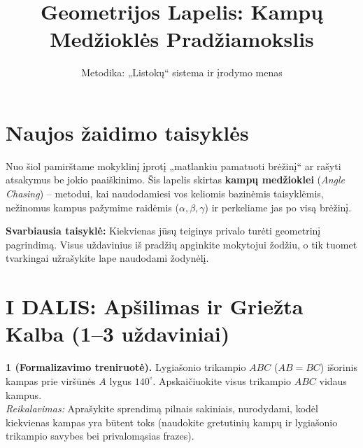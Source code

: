 \documentclass[11pt,a4paper]{scrartcl}
\title{\Large Geometrijos Lapelis: Kampų Medžioklės Pradžiamokslis}
\author{Metodika: „Listokų“ sistema ir įrodymo menas}
\date{}
\begin{document}
\maketitle

\section*{Naujos žaidimo taisyklės}

Nuo šiol pamirštame mokyklinį įprotį „matlankiu pamatuoti brėžinį“ ar rašyti atsakymus be jokio paaiškinimo. Šis lapelis skirtas \textbf{kampų medžioklei} (\textit{Angle Chasing}) – metodui, kai naudodamiesi vos keliomis bazinėmis taisyklėmis, nežinomus kampus pažymime raidėmis (\(\alpha, \beta, \gamma\)) ir perkeliame jas po visą brėžinį.

\textbf{Svarbiausia taisyklė:} Kiekvienas jūsų teiginys privalo turėti geometrinį pagrindimą. Visus uždavinius iš pradžių apginkite mokytojui žodžiu, o tik tuomet tvarkingai užrašykite lape naudodami žodynėlį.

\vspace{0.5cm}
\noindent{}
\vspace{0.5cm}

\section*{I DALIS: Apšilimas ir Griežta Kalba (1–3 uždaviniai)}

\textbf{1 (Formalizavimo treniruotė).} Lygiašonio trikampio \(ABC\) (\(AB=BC\)) išorinis kampas prie viršūnės \(A\) lygus \(140^\circ\). Apskaičiuokite visus trikampio \(ABC\) vidaus kampus. \\
\textit{Reikalavimas:} Aprašykite sprendimą pilnais sakiniais, nurodydami, kodėl kiekvienas kampas yra būtent toks (naudokite gretutinių kampų ir lygiašonio trikampio savybes bei privalomąsias frazes).
\end{document}
